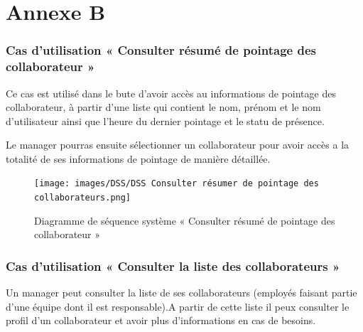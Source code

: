 \chapter*{Annexe B}\label{ch:annexeB}

 
 
 \subsection*{Cas d'utilisation « Consulter résumé de pointage des collaborateur »}
    Ce cas est utilisé dans le bute d'avoir accès au informations de pointage des collaborateur, à partir d'une liste qui contient le nom, prénom et le nom d'utilisateur ainsi que l'heure du dernier pointage et le statu de présence.
    
    Le manager pourras ensuite sélectionner un collaborateur pour avoir accès a la totalité de ses informations de pointage de manière détaillée.
        \begin{figure}[h!]
             \centering
            \texttt{[image: images/DSS/DSS Consulter résumer de pointage des collaborateurs.png]}
             \caption{Diagramme de séquence système « Consulter résumé de pointage des collaborateur »}
             \label{fig4}
        \end{figure}

    \subsection*{Cas d'utilisation « Consulter la liste des collaborateurs »}
    Un manager peut consulter la liste de ses collaborateurs (employés faisant partie d'une équipe dont il est responsable).A partir de cette liste il peux consulter le profil d'un collaborateur et avoir plus d'informations en cas de besoins.   
    
